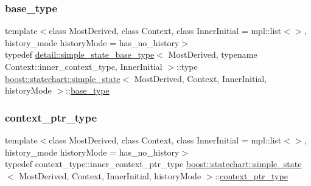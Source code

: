 \subsubsection{\texorpdfstring{base\+\_\+type}{base\_type}}
{\footnotesize\ttfamily template$<$class Most\+Derived, class Context, class Inner\+Initial = mpl\+::list$<$$>$, history\+\_\+mode history\+Mode = has\+\_\+no\+\_\+history$>$ \\
typedef \mbox{\hyperlink{structboost_1_1statechart_1_1detail_1_1simple__state__base__type}{detail\+::simple\+\_\+state\+\_\+base\+\_\+type}}$<$ Most\+Derived, typename Context\+::inner\+\_\+context\+\_\+type, Inner\+Initial $>$\+::type \mbox{\hyperlink{classboost_1_1statechart_1_1simple__state}{boost\+::statechart\+::simple\+\_\+state}}$<$ Most\+Derived, Context, Inner\+Initial, history\+Mode $>$\+::\mbox{\hyperlink{classboost_1_1statechart_1_1simple__state_a0a4e135c0eb6d114bd2e3e6e61ea3d5f}{base\+\_\+type}}\hspace{0.3cm}{\ttfamily [private]}}

\mbox{\label{classboost_1_1statechart_1_1simple__state_ac7e361322d53b3f57976ff23056b59e7}} 
\subsubsection{\texorpdfstring{context\+\_\+ptr\+\_\+type}{context\_ptr\_type}}
{\footnotesize\ttfamily template$<$class Most\+Derived, class Context, class Inner\+Initial = mpl\+::list$<$$>$, history\+\_\+mode history\+Mode = has\+\_\+no\+\_\+history$>$ \\
typedef context\+\_\+type\+::inner\+\_\+context\+\_\+ptr\+\_\+type \mbox{\hyperlink{classboost_1_1statechart_1_1simple__state}{boost\+::statechart\+::simple\+\_\+state}}$<$ Most\+Derived, Context, Inner\+Initial, history\+Mode $>$\+::\mbox{\hyperlink{classboost_1_1statechart_1_1simple__state_ac7e361322d53b3f57976ff23056b59e7}{context\+\_\+ptr\+\_\+type}}}

\mbox{\label{classboost_1_1statechart_1_1simple__state_ac053eaa9e1b0e3ccbf2231786cd651c4}} 
